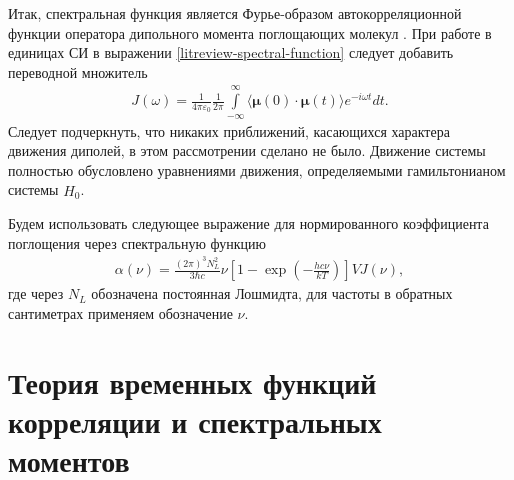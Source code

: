 \documentclass[12pt]{article}
\newcommand{\lb}{\left(}
\newcommand{\rb}{\right)}
\newcommand{\lsq}{\left[}
\newcommand{\rsq}{\right]}
\newcommand{\intty}{\int\limits_{-\infty}^\infty}
\newcommand{\mean}[1]{\langle #1 \rangle}
\newcommand{\bs}{\boldsymbol}
\begin{document}
Итак, спектральная функция является Фурье-образом автокорреляционной функции оператора дипольного момента поглощающих молекул \cite{gordon1968}. При работе в единицах СИ в выражении \eqref{litreview-spectral-function} следует добавить переводной множитель
\begin{gather}
    J(\omega) = \frac{1}{4\pi \varepsilon_0} \frac{1}{2\pi} \intty \mean{ \bs{\mu}(0) \cdot \bs{\mu}(t) } e^{-i \omega t} dt. \label{litreview-spectral-function} 
\end{gather}
Следует подчеркнуть, что никаких приближений, касающихся характера движения диполей, в этом рассмотрении сделано не было. Движение системы полностью обусловлено уравнениями движения, определяемыми гамильтонианом системы $\hat{H}_0$. \par
Будем использовать следующее выражение для нормированного коэффициента поглощения через спектральную функцию 
\begin{gather}
    \alpha(\nu) = \frac{(2 \pi)^3 N_L^2}{3 \hbar c} \nu \lsq 1 - \exp \lb -\frac{h c \nu}{k T} \rb \rsq V J(\nu), \label{part1-absorption-coefficient-definition1}  
\end{gather}
%
где через $N_L$ обозначена постоянная Лошмидта, для частоты в обратных сантиметрах применяем обозначение $\nu$. 

\section{Теория временных функций корреляции и спектральных моментов} \label{section:correlation_functions}
\end{document}
